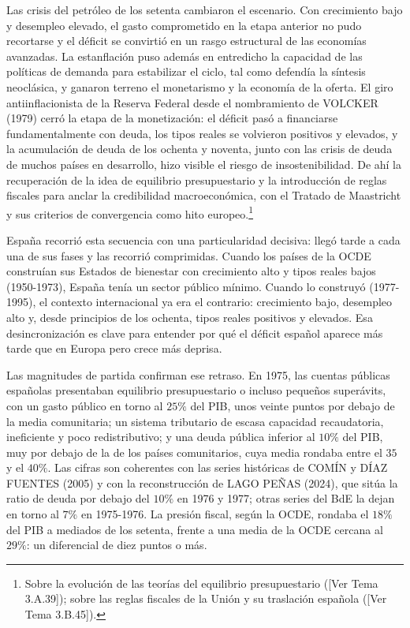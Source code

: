 \documentclass[10pt,a4paper]{article}
\newcommand{\authorfont}[1]{{\fontfamily{EBGaramond-TLF}\selectfont #1}}
\begin{document}
Las crisis del petróleo de los setenta cambiaron el escenario. Con crecimiento bajo y desempleo elevado, el gasto comprometido en la etapa anterior no pudo recortarse y el déficit se convirtió en un rasgo estructural de las economías avanzadas. La estanflación puso además en entredicho la capacidad de las políticas de demanda para estabilizar el ciclo, tal como defendía la síntesis neoclásica, y ganaron terreno el monetarismo y la economía de la oferta. El giro antiinflacionista de la Reserva Federal desde el nombramiento de VOLCKER (1979) cerró la etapa de la monetización: el déficit pasó a financiarse fundamentalmente con deuda, los tipos reales se volvieron positivos y elevados, y la acumulación de deuda de los ochenta y noventa, junto con las crisis de deuda de muchos países en desarrollo, hizo visible el riesgo de insostenibilidad. De ahí la recuperación de la idea de equilibrio presupuestario y la introducción de reglas fiscales para anclar la credibilidad macroeconómica, con el Tratado de Maastricht y sus criterios de convergencia como hito europeo.\footnote{%
    Sobre la evolución de las teorías del equilibrio presupuestario ([\authorfont{Ver Tema 3.A.39}]); sobre las reglas fiscales de la Unión y su traslación española ([\authorfont{Ver Tema 3.B.45}]).
}

España recorrió esta secuencia con una particularidad decisiva: llegó tarde a cada una de sus fases y las recorrió comprimidas. Cuando los países de la OCDE construían sus Estados de bienestar con crecimiento alto y tipos reales bajos (1950-1973), España tenía un sector público mínimo. Cuando lo construyó (1977-1995), el contexto internacional ya era el contrario: crecimiento bajo, desempleo alto y, desde principios de los ochenta, tipos reales positivos y elevados. Esa desincronización es clave para entender por qué el déficit español aparece más tarde que en Europa pero crece más deprisa.

Las magnitudes de partida confirman ese retraso. En 1975, las cuentas públicas españolas presentaban equilibrio presupuestario o incluso pequeños superávits, con un gasto público en torno al $25\%$ del PIB, unos veinte puntos por debajo de la media comunitaria; un sistema tributario de escasa capacidad recaudatoria, ineficiente y poco redistributivo; y una deuda pública inferior al $10\%$ del PIB, muy por debajo de la de los países comunitarios, cuya media rondaba entre el $35$ y el $40\%$. Las cifras son coherentes con las series históricas de COMÍN y DÍAZ FUENTES (2005) y con la reconstrucción de LAGO PEÑAS (2024), que sitúa la ratio de deuda por debajo del $10\%$ en 1976 y 1977; otras series del BdE la dejan en torno al $7\%$ en 1975-1976. La presión fiscal, según la OCDE, rondaba el $18\%$ del PIB a mediados de los setenta, frente a una media de la OCDE cercana al $29\%$: un diferencial de diez puntos o más.
\end{document}
